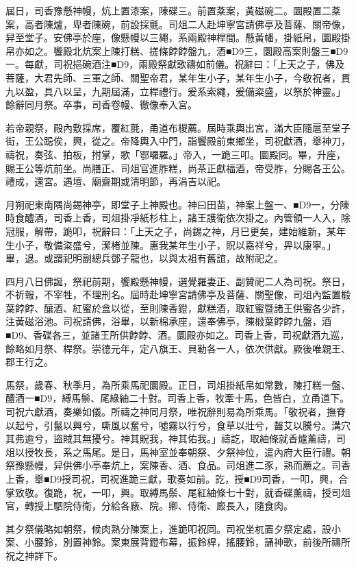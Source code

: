 \begin{pinyinscope}
屆日，司香豫懸神幔，炕上置漆案，陳碟三。前置棻案，黃磁碗二。圜殿置二棻案，高者陳爐，卑者陳碗，前設採氈。司俎二人赴坤寧宮請佛亭及菩薩、關帝像，舁至堂子。安佛亭於座，像懸幔以三繩，系兩殿神桿間。懸黃幡，掛紙帛，圜殿掛帛亦如之。饗殿北炕案上陳打糕、搓條餑餑盤九，酒■D9三，圜殿高案則盤三■D9一。每獻，司祝挹碗酒注■D9，兩殿祭獻歌禱如前儀。祝辭曰：「上天之子，佛及菩薩，大君先師、三軍之師、關聖帝君，某年生小子，某年生小子，今敬祝者，貫九以盈，具八以呈，九期屆滿，立桿禮行。爰系索繩，爰備粢盛，以祭於神靈。」餘辭同月祭。卒事，司香卷幔、徹像奉入宮。

若帝親祭，殿內敷採席，覆紅氈，甬道布椶薦。屆時乘輿出宮，滿大臣隨扈至堂子街，王公跽俟，興，從之。帝降輿入中門，詣饗殿前東鄉坐，司祝獻酒，舉神刀，禱祝，奏弦、拍板，拊掌，歌「鄂囉羅。」帝入，一跪三叩。圜殿同。畢，升座，賜王公等炕前坐。尚膳正、司俎官進胙糕，尚茶正獻福酒，帝受胙，分賜各王公。禮成，還宮。遇壇、廟齋期或清明節，再涓吉以祀。

月朔祀東南隅尚錫神亭，即堂子上神殿也。神曰田苗，神案上盤一、■D9一，分陳時食醴酒，司香上香，司俎掛凈紙杉柱上，諸王護衛依次掛之。內管領一人入，除冠服，解帶，跪叩，祝辭曰：「上天之子，尚錫之神，月巳更矣，建始維新，某年生小子，敬備粢盛兮，潔楮並陳。惠我某年生小子，貺以嘉祥兮，畀以康寧。」畢，退。或謂祀明副總兵鄧子龍也，以與太祖有舊誼，故附祀之。

四月八日佛誕，祭祀前期，饗殿懸神幔，選覺羅妻正、副贊祀二人為司祝。祭日，不祈報，不宰牲，不理刑名。屆時赴坤寧宮請佛亭及菩薩、關聖像，司俎內監置椴葉餑餑、釀酒、紅蜜於盒以從，至則陳香鐙，獻糕酒，取紅蜜暨諸王供蜜各少許，注黃磁浴池。司祝請佛，浴畢，以新棉承座，還奉佛亭，陳椴葉餑餑九盤，酒■D9、香碟各三，並諸王所供餑餑、酒。圜殿亦如之。司香上香，司祝獻酒九巡，餘略如月祭、桿祭。崇德元年，定八旗王、貝勒各一人，依次供獻。厥後唯親王、郡王行之。

馬祭，歲春、秋季月，為所乘馬祀圜殿。正日，司俎掛紙帛如常數，陳打糕一盤、醴酒一■D9，縛馬鬃、尾綠紬二十對。司香上香，牧牽十馬，色皆白，立甬道下。司祝六獻酒，奏樂如儀。所禱之神同月祭，唯祝辭則易為所乘馬。「敬祝者，撫脊以起兮，引鬣以興兮，嘶風以奮兮，噓霧以行兮，食草以壯兮，齧艾以騰兮。溝穴其弗逾兮，盜賊其無擾兮。神其貺我，神其佑我。」禱訖，取紬條就香爐薰禱，司俎以授牧長，系之馬尾。是日，馬神室並奉朝祭、夕祭神位，遣內府大臣行禮。朝祭豫懸幔，舁供佛小亭奉炕上，案陳香、酒、食品。司俎進二豕，熟而薦之。司香上香，舉■D9授司祝，司祝進跪三獻，歌奏如前。訖，授■D9司香，一叩，興，合掌致敬。復跪，祝，一叩，興。取縛馬鬃、尾紅紬條七十對，就香碟薰禱，授司俎官，轉授上駟院侍衛，分給各廠、院。卿、侍衛、廄長入，隨食肉。

其夕祭儀略如朝祭，候肉熟分陳案上，進跪叩祝同。司祝坐杌置夕祭定處，設小案、小腰鈴，別置神鈴。案東展背鐙布幕，振鈴桿，搖腰鈴，誦神歌，前後所禱所祝之神詳下。


\end{pinyinscope}
